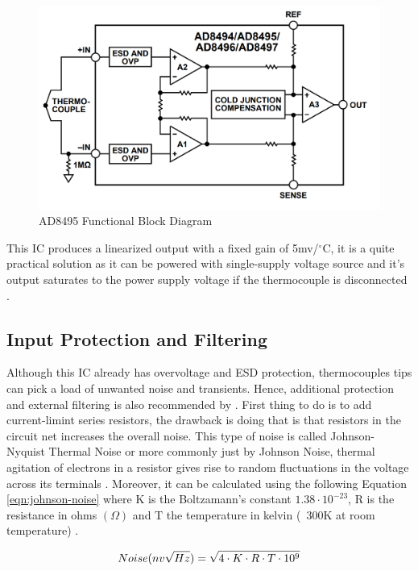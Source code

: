 			\begin{figure}[htbp]
				\centering
					\includegraphics[width=.8\textwidth]{figuras/fig-ad8495-functional-block}
				\caption{AD8495 Functional Block Diagram \cite{ad8495-functional-block}}
				\label{fig:ad8495-functional-block}
			\end{figure}
			
		This IC produces a linearized output with a fixed gain of 5mv/$^{\circ}$C, it is a quite practical solution as it can be powered with single-supply voltage source and it's output saturates to the power supply voltage if the thermocouple is disconnected \cite{ad8495-datasheet}.

	\subsection{Input Protection and Filtering}\label{ssec:ad8495InputProtectionAndFiltering}
	
	Although this IC already has overvoltage and ESD protection, thermocouples tips can pick a load of unwanted noise and transients. Hence, additional protection and external filtering is also recommended by \cite{two-ways-thermocouple}. First thing to do is to add current-limint series resistors, the drawback is doing that is that resistors in the circuit net increases the overall noise. This type of noise is called Johnson-Nyquist Thermal Noise or more commonly just by Johnson Noise, thermal agitation of electrons in a resistor gives rise to random fluctuations in the voltage across its terminals \cite{romero1998johnson}. Moreover, it can be calculated using the following Equation \ref{eqn:johnson-noise} where K is the Boltzamann's constant $1.38 \cdot 10^{-23}$, R is the resistance in ohms $(\Omega)$ and T the temperature in kelvin (~300K at room temperature) \cite{sensors2000}.
	
		\begin{equation}\label{eqn:johnson-noise}
			Noise (nv\/\sqrt{Hz}) = \sqrt{4 \cdot K \cdot R \cdot T \cdot 10^{9}}
		\end{equation}
		

